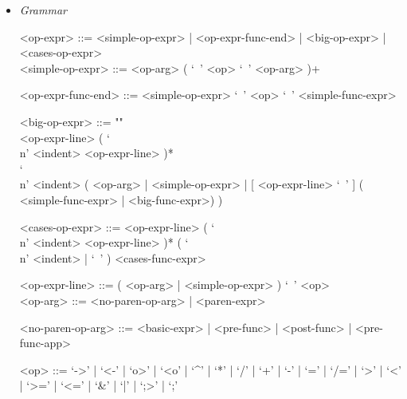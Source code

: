 \documentclass{article}
\begin{document}
\begin{itemize}
\item \textit{Grammar}
\begin{grammar}
<op-expr> ::=
<simple-op-expr> | <op-expr-func-end> | <big-op-expr> | <cases-op-expr>
\\

<simple-op-expr> ::=  <op-arg> ( `\ ' <op>  `\ ' <op-arg> )+

<op-expr-func-end> ::= <simple-op-expr> `\ '  <op> `\ ' <simple-func-expr>

<big-op-expr> ::= ""\\
<op-expr-line> ( `\\n' <indent> <op-expr-line> )* \\
`\\n' <indent>
( <op-arg> | <simple-op-expr> |
  [ <op-expr-line> `\ ' ] ( <simple-func-expr> | <big-func-expr>)
)

<cases-op-expr> ::=
<op-expr-line> ( `\\n' <indent> <op-expr-line> )*
( `\\n' <indent> | `\ ' ) <cases-func-expr> 

<op-expr-line> ::= ( <op-arg> | <simple-op-expr> ) `\ ' <op> 
\\

<op-arg> ::= <no-paren-op-arg> | <paren-expr>

<no-paren-op-arg> ::= <basic-expr> | <pre-func> | <post-func> | <pre-func-app>

<op> ::= 
`->' | `<-' | `o>' | `<o' | `^' | `*' | `/' | `+' | `-' |
`=' | `/=' | `>' | `<' | `>=' | `<=' | `\&' | `|' | `;>' | `;'\\
\end{grammar}
\end{itemize}
\end{document}
